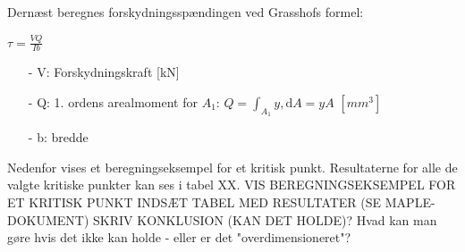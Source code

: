 Dernæst beregnes forskydningsspændingen ved Grasshofs formel:

\begin{center}
	$\tau = \frac{VQ}{Ib}$
\end{center}

\begin{itemize}
	\item[-] V: Forskydningskraft [kN]
	\item[-] Q: 1. ordens arealmoment for $A_1$: $Q = \int_{A_1}y, \mathrm{d}A = yA$ $[mm^3]$
	\item[-] b: bredde
\end{itemize}

Nedenfor vises et beregningseksempel for et kritisk punkt. Resultaterne for alle de valgte kritiske punkter kan ses i tabel XX. 
\newline
\newline
VIS BEREGNINGSEKSEMPEL FOR ET KRITISK PUNKT
\newline
\newline
INDSÆT TABEL MED RESULTATER (SE MAPLE-DOKUMENT) 
\newline
\newline
SKRIV KONKLUSION (KAN DET HOLDE)? Hvad kan man gøre hvis det ikke kan holde - eller er det "overdimensioneret"?